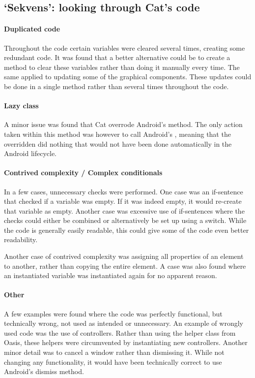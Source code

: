 \subsection{`Sekvens': looking through Cat's code}\label{subsec:collab_catcorrections}

\paragraph{Duplicated code}
Throughout the code certain variables were cleared several times, creating some redundant code. It was found that a better alternative could be to create a method to clear these variables rather than doing it manually every time. The same applied to updating some of the graphical components. These updates could be done in a single method rather than several times throughout the code.

\paragraph{Lazy class}
A minor issue was found that Cat overrode Android's  method. The only action taken within this method was however to call Android's , meaning that the overridden  did nothing that would not have been done automatically in the Android lifecycle.

\paragraph{Contrived complexity / Complex conditionals}
In a few cases, unnecessary checks were performed. One case was an if-sentence that checked if a variable was empty. If it was indeed empty, it would re-create that variable as empty.
Another case was excessive use of if-sentences where the checks could either be combined or alternatively be set up using a switch.
While the code is generally easily readable, this could give some of the code even better readability.

Another case of contrived complexity was assigning all properties of an element to another, rather than copying the entire element.
A case was also found where an instantiated variable was instantiated again for no apparent reason.

\paragraph{Other}
A few examples were found where the code was perfectly functional, but technically wrong, not used as intended or unnecessary.
An example of wrongly used code was the use of controllers. Rather than using the helper class from Oasis, these helpers were circumvented by instantiating new controllers.
Another minor detail was to cancel a window rather than dismissing it. While not changing any functionality, it would have been technically correct to use Android's dismiss method.

